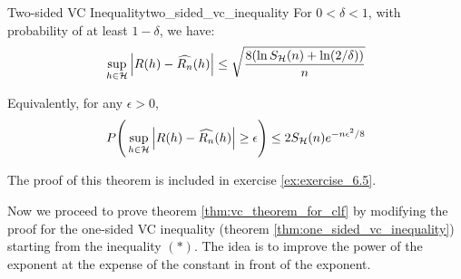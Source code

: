 \begin{theorem}{Two-sided VC Inequality}{two_sided_vc_inequality}
    For $0<\delta<1$, with probability of at least $1-\delta$, we have:
    \begin{align*}
        \sup_{h\in\mathcal{H}} \Big| 
            R(h) - \widehat{R_n}(h)
         \Big| \le \sqrt{
            \frac{8(\ln S_{\mathcal{H}}(n) + \ln(2/\delta))}{n}
        }
    \end{align*}

    \noindent Equivalently, for any $\epsilon>0$, 
    \begin{align*}
        P\Bigg( 
            \sup_{h\in\mathcal{H}} \Big| 
                R(h) - \widehat{R_n}(h)
             \Big|\ge \epsilon
         \Bigg)\le 2S_{\mathcal{H}}(n)e^{-n\epsilon^2/8}
    \end{align*}
\end{theorem}

\begin{proof*}
    The proof of this theorem is included in exercise \ref{ex:exercise_6.5}.
\end{proof*}

\noindent Now we proceed to prove theorem \ref{thm:vc_theorem_for_clf} by modifying the proof for the one-sided VC inequality (theorem \ref{thm:one_sided_vc_inequality}) starting from the inequality $(*)$. The idea is to improve the power of the exponent at the expense of the constant in front of the exponent.

